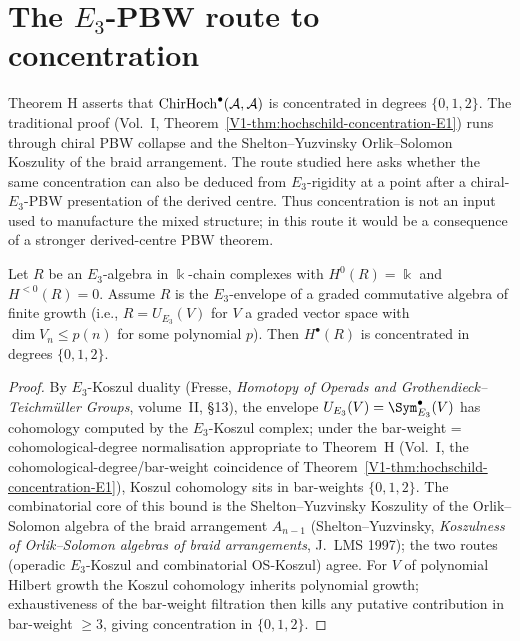 \section{The $E_3$-PBW route to concentration}
\label{sec:chd-rigidity}

Theorem H asserts that
$\mathrm{ChirHoch}^\bullet(\mathcal{A}, \mathcal{A})$ is concentrated in degrees $\{0,1,2\}$.
The traditional proof (Vol.~I,
Theorem~\ref*{V1-thm:hochschild-concentration-E1}) runs
through chiral PBW collapse and the Shelton--Yuzvinsky Orlik--Solomon
Koszulity of the braid arrangement. The route studied here
asks whether the same concentration can also be deduced from
$E_3$-rigidity at a point after a chiral-$E_3$-PBW presentation of the
derived centre. Thus concentration is not an input used to manufacture
the mixed structure; in this route it would be a consequence of a
stronger derived-centre PBW theorem.

\begin{lemma}%
\label{lem:chd-e3-rigidity-point}%
%
Let $R$ be an $E_3$-algebra in $\Bbbk$-chain complexes with
$H^0(R) = \Bbbk$ and $H^{<0}(R) = 0$. Assume $R$ is the $E_3$-envelope
of a graded commutative algebra of finite growth (i.e., $R = U_{E_3}(V)$
for $V$ a graded vector space with $\dim V_n \le p(n)$ for some
polynomial $p$). Then $H^\bullet(R)$ is concentrated in degrees
$\{0, 1, 2\}$.
\end{lemma}

\begin{proof}
By $E_3$-Koszul duality (Fresse, \emph{Homotopy of Operads and
Grothendieck--Teichm\"uller Groups}, volume~II, \S13), the envelope
$U_{E_3}(V)=\Sym^{\bullet}_{E_3}(V)$ has cohomology computed by the
$E_3$-Koszul complex; under the bar-weight = cohomological-degree
normalisation appropriate to Theorem~H (Vol.~I, the
cohomological-degree/bar-weight coincidence of
Theorem~\ref*{V1-thm:hochschild-concentration-E1}), Koszul cohomology
sits in bar-weights $\{0,1,2\}$. The combinatorial core of this
bound is the Shelton--Yuzvinsky Koszulity of the Orlik--Solomon
algebra of the braid arrangement $A_{n-1}$ (Shelton--Yuzvinsky,
\emph{Koszulness of Orlik--Solomon algebras of braid
arrangements}, J.~LMS 1997); the two routes (operadic
$E_3$-Koszul and combinatorial OS-Koszul) agree. For $V$ of
polynomial Hilbert growth the Koszul cohomology inherits polynomial
growth; exhaustiveness of the bar-weight filtration then kills any
putative contribution in bar-weight $\ge 3$, giving concentration
in $\{0,1,2\}$.
\end{proof}

